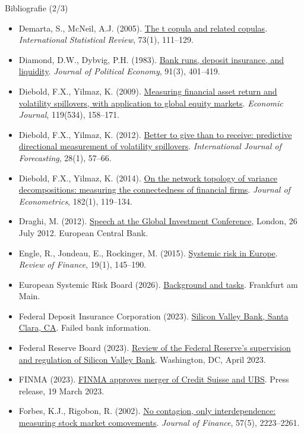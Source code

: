 \begin{frame}{Bibliografie (2/3)}
\itemsize{\tiny}
\begin{itemize}
    \item Demarta, S., McNeil, A.J. (2005). \href{https://doi.org/10.1111/j.1751-5823.2005.tb00254.x}{The t copula and related copulas}. \textit{International Statistical Review}, 73(1), 111--129.
    \item Diamond, D.W., Dybvig, P.H. (1983). \href{https://doi.org/10.1086/261155}{Bank runs, deposit insurance, and liquidity}. \textit{Journal of Political Economy}, 91(3), 401--419.
    \item Diebold, F.X., Yilmaz, K. (2009). \href{https://doi.org/10.1111/j.1468-0297.2008.02208.x}{Measuring financial asset return and volatility spillovers, with application to global equity markets}. \textit{Economic Journal}, 119(534), 158--171.
    \item Diebold, F.X., Yilmaz, K. (2012). \href{https://doi.org/10.1016/j.ijforecast.2011.02.006}{Better to give than to receive: predictive directional measurement of volatility spillovers}. \textit{International Journal of Forecasting}, 28(1), 57--66.
    \item Diebold, F.X., Yilmaz, K. (2014). \href{https://doi.org/10.1016/j.jeconom.2014.04.012}{On the network topology of variance decompositions: measuring the connectedness of financial firms}. \textit{Journal of Econometrics}, 182(1), 119--134.
    \item Draghi, M. (2012). \href{https://www.ecb.europa.eu/press/key/date/2012/html/sp120726.en.html}{Speech at the Global Investment Conference}, London, 26 July 2012. European Central Bank.
    \item Engle, R., Jondeau, E., Rockinger, M. (2015). \href{https://doi.org/10.1093/rof/rfu012}{Systemic risk in Europe}. \textit{Review of Finance}, 19(1), 145--190.
    \item European Systemic Risk Board (2026). \href{https://www.esrb.europa.eu/about/background/html/index.en.html}{Background and tasks}. Frankfurt am Main.
    \item Federal Deposit Insurance Corporation (2023). \href{https://www.fdic.gov/resources/resolutions/bank-failures/failed-bank-list/silicon-valley.html}{Silicon Valley Bank, Santa Clara, CA}. Failed bank information.
    \item Federal Reserve Board (2023). \href{https://www.federalreserve.gov/publications/files/svb-review-20230428.pdf}{Review of the Federal Reserve's supervision and regulation of Silicon Valley Bank}. Washington, DC, April 2023.
    \item FINMA (2023). \href{https://www.finma.ch/en/news/2023/03/20230319-mm-cs-ubs/}{FINMA approves merger of Credit Suisse and UBS}. Press release, 19 March 2023.
    \item Forbes, K.J., Rigobon, R. (2002). \href{https://doi.org/10.1111/0022-1082.00494}{No contagion, only interdependence: measuring stock market comovements}. \textit{Journal of Finance}, 57(5), 2223--2261.
\end{itemize}
\end{frame}

